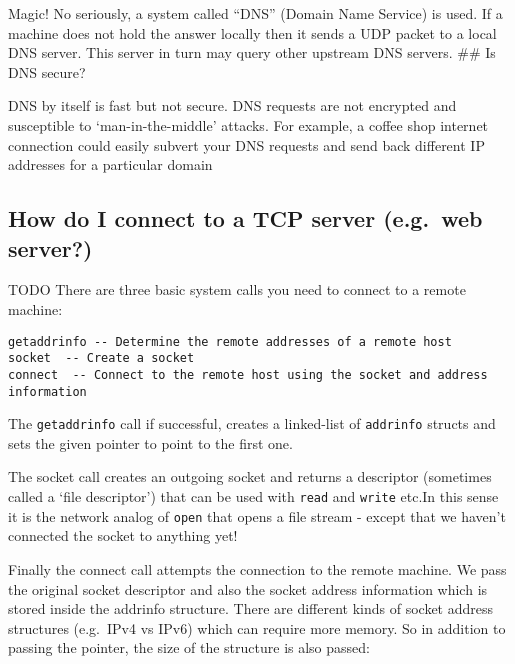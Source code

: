Magic! No seriously, a system called ``DNS'' (Domain Name Service) is
used. If a machine does not hold the answer locally then it sends a UDP
packet to a local DNS server. This server in turn may query other
upstream DNS servers. \#\# Is DNS secure?

DNS by itself is fast but not secure. DNS requests are not encrypted and
susceptible to `man-in-the-middle' attacks. For example, a coffee shop
internet connection could easily subvert your DNS requests and send back
different IP addresses for a particular domain

\subsection{How do I connect to a TCP server (e.g.~web
server?)}\label{how-do-i-connect-to-a-tcp-server-e.g.web-server}

TODO There are three basic system calls you need to connect to a remote
machine:

\begin{verbatim}
getaddrinfo -- Determine the remote addresses of a remote host
socket  -- Create a socket
connect  -- Connect to the remote host using the socket and address information
\end{verbatim}

The \texttt{getaddrinfo} call if successful, creates a linked-list of
\texttt{addrinfo} structs and sets the given pointer to point to the
first one.

The socket call creates an outgoing socket and returns a descriptor
(sometimes called a `file descriptor') that can be used with
\texttt{read} and \texttt{write} etc.In this sense it is the network
analog of \texttt{open} that opens a file stream - except that we
haven't connected the socket to anything yet!

Finally the connect call attempts the connection to the remote machine.
We pass the original socket descriptor and also the socket address
information which is stored inside the addrinfo structure. There are
different kinds of socket address structures (e.g.~IPv4 vs IPv6) which
can require more memory. So in addition to passing the pointer, the size
of the structure is also passed:

\begin{Shaded}
\begin{Highlighting}[]
\end{Highlighting}
\end{Shaded}

